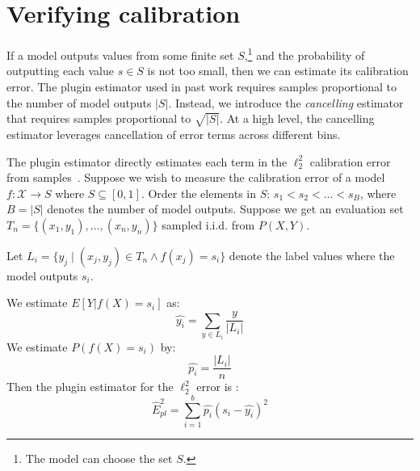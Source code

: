 \section{Verifying calibration}
\label{sec:verifying_calibration}

If a model outputs values from some finite set $S$,\footnote{The model can choose the set $S$.} and the probability of outputting each value $s \in S$ is not too small, then we can estimate its calibration error. The plugin estimator  used in past work requires samples proportional to the number of model outputs $|S|$. Instead, we introduce the \emph{cancelling} estimator that requires samples proportional to $\sqrt{|S|}$. At a high level, the cancelling estimator leverages cancellation of error terms across different bins.



The plugin estimator directly estimates each term in the $\ell_2^2$ calibration error from samples~\cite{nguyen2015posterior, hendrycks2019anomaly, kuleshov2015calibrated, hendrycks2019pretraining}. Suppose we wish to measure the calibration error of a model $f : \mathcal{X} \to S$ where $S \subseteq [0, 1]$. Order the elements in $S$: $s_1 < s_2 < \dots < s_B$, where $B = |S|$ denotes the number of model outputs. Suppose we get an evaluation set $T_n = \{(x_1, y_1), \dots, (x_n, y_n)\}$ sampled i.i.d. from $P(X, Y)$.

\begin{definition}
\label{dfn:plugin-estimator}
  Let $L_i = \{ y_j \; | \; (x_j, y_j) \in T_n\wedge f(x_j) = s_i \}$  denote the label values where the model outputs $s_i$.

We estimate $E[Y | f(X) = s_i]$ as:
\[ \hat{y_i} = \sum_{y \in L_i} \frac{y}{|L_i|} \] 
We estimate $P(f(X) = s_i)$ by:
\[ \hat{p_i} = \frac{|L_i|}{n} \]
  Then the plugin estimator for the $\ell_2^2$ error is :
\[ \hat{E}_{pl}^2 = \sum_{i=1}^b \hat{p_i} (s_i - \hat{y_i})^2 \]
\end{definition}


